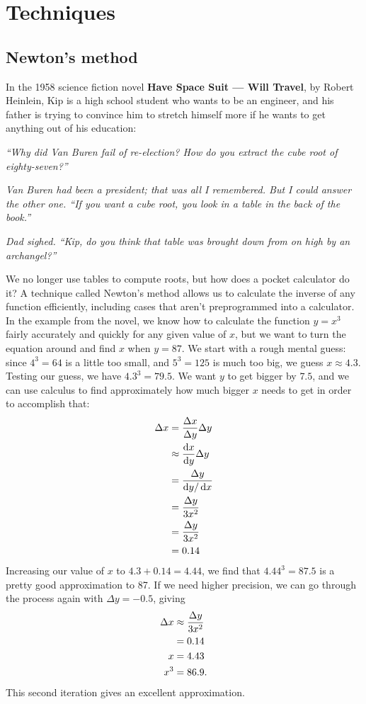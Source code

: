 \chapter{Techniques}

\section{Newton's method}\label{sec:newtons-method}

In the 1958 science fiction novel \textbf{Have Space Suit --- Will Travel}, by
Robert Heinlein, Kip is a high school student who wants to be an engineer,
and his father is trying to convince him to stretch himself more if he
wants to get anything out of his education:

\newcommand{\quoted}[1]{\textit{#1}}

\quoted{``Why did Van Buren fail of re-election? How do you extract the cube
root of eighty-seven?''}

\quoted{Van Buren had been a president; that was all I remembered. But I could
answer the other one. ``If you want a cube root, you look in a table
in the back of the book.''}

\quoted{Dad sighed. ``Kip, do you think that table was brought down from on
high by an archangel?''}

We no longer use tables to compute roots, but how does a pocket calculator
do it? A technique called Newton's method allows us to calculate
the inverse of any function efficiently, including cases that aren't
preprogrammed into a calculator. In the example from the novel,
we know how to calculate the function $y=x^3$ fairly accurately and
quickly for any given value of $x$, but we want to turn the equation
around and find $x$ when $y=87$. We start with a rough mental guess:
since $4^3=64$ is a little too small, and $5^3=125$ is much too big,
we guess $x\approx 4.3$. Testing our guess, we have
$4.3^3=79.5$. We want $y$ to get bigger by $7.5$, and we can use
calculus to find approximately how much bigger $x$ needs to get
in order to accomplish that:
\begin{align*}
  \Delta x &= \frac{\Delta x}{\Delta y} \Delta y \\
           &\approx \frac{\operatorname{d\!} x}{\operatorname{d\!} y} \Delta y \\
           &= \frac{\Delta y}{\operatorname{d\!} y/\operatorname{d\!} x} \\
           &= \frac{\Delta y}{3x^2} \\
           &= \frac{\Delta y}{3x^2} \\
           &= 0.14
\end{align*}
Increasing our value of $x$ to $4.3+0.14=4.44$, we find that 
$4.44^3=87.5$ is a pretty good approximation to 87. If we need higher
precision, we can go through the process again with $\Delta y=-0.5$,
giving
\begin{align*}
  \Delta x &\approx \frac{\Delta y}{3x^2} \\
           &= 0.14 \\
  x &= 4.43 \\
  x^3 &= 86.9.
\end{align*}
This second iteration gives an excellent approximation.

